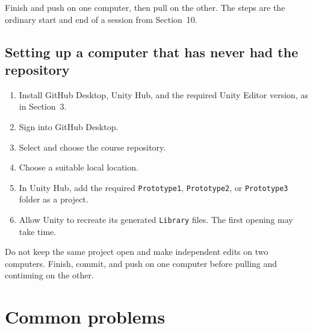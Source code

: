 \documentclass[11pt,a4paper]{article}
\newcommand{\button}[1]{\tcbox[on line,colback=white,colframe=Rule,boxrule=.5pt,
  arc=1mm,left=1.5mm,right=1.5mm,top=.6mm,bottom=.6mm]{\small\bfseries #1}}
\newcommand{\pathbit}[1]{\texttt{#1}}
\begin{document}
Finish and push on one computer, then pull on the other. The steps are the ordinary start
and end of a session from Section~10.

\begin{center}
\end{center}

\subsection{Setting up a computer that has never had the repository}
\begin{enumerate}
\item Install GitHub Desktop, Unity Hub, and the required Unity Editor version, as in
Section~3.
\item Sign into GitHub Desktop.
\item Select \button{Clone a repository} and choose the course repository.
\item Choose a suitable local location.
\item In Unity Hub, add the required \pathbit{Prototype1}, \pathbit{Prototype2}, or
\pathbit{Prototype3} folder as a project.
\item Allow Unity to recreate its generated \pathbit{Library} files. The first opening
may take time.
\end{enumerate}

\begin{warnbox}
Do not keep the same project open and make independent edits on two computers. Finish,
commit, and push on one computer before pulling and continuing on the other.
\end{warnbox}

\section{Common problems}
\end{document}
